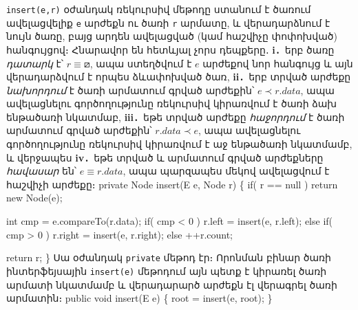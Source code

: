 \texttt{insert(e,r)} օժանդակ ռեկուրսիվ մեթոդը ստանում է 
ծառում ավելացվելիք \texttt{e} արժեքն ու ծառի \texttt{r} 
արմատը, և վերադարձնում է նույն ծառը, բայց արդեն ավելացված 
(կամ հաշվիչը փոփոխված) հանգույցով։ 
Հնարավոր են հետևյալ չորս դեպքերը․ 
\textbf{i․}~երբ ծառը \emph{դատարկ} է՝ \(r\equiv\boxslash\), ապա 
ստեղծվում է \(e\) արժեքով նոր հանգույց և այն վերադարձվում 
է որպես ձևափոխված ծառ,  
\textbf{ii․}~երբ տրված արժեքը \emph{նախորդում} է ծառի արմատում 
գրված արժեքին՝ \(e\prec r.data\), ապա ավելացնելու գործողությունը 
ռեկուրսիվ կիրառվում է ծառի ձախ ենթածառի նկատմաբ, 
\textbf{iii․}~եթե տրված արժեքը \emph{հաջորդում} է ծառի 
արմատում գրված արժեքին՝ \(r.data\prec e\), ապա ավելացնելու 
գործողությունը ռեկուրսիվ կիրառվում է աջ ենթածառի նկատմամբ, 
և վերջապես \textbf{iv․}~եթե տրված և արմատում գրված արժեքները 
\emph{հավասար} են՝ \(e\equiv r.data\), ապա պարզապես մեկով 
ավելացվում է հաշվիչի արժեքը։ 
\nwenddocs{}\endmoddef{}
private Node insert(E e, Node r)
\{
  if( r == null )
    return new Node(e);

  int cmp = e.compareTo(r.data);
  if( cmp < 0 )
    r.left = insert(e, r.left);
  else if( cmp > 0 )
    r.right = insert(e, r.right);
  else
    ++r.count;

  return r;
\}
\nwendcode{}\nwdocspar
Սա օժանդակ \texttt{private} մեթոդ էր։ Որոնման բինար ծառի
ինտերֆեյսային \texttt{insert(e)} մեթոդում այն պետք է կիրառել
ծառի արմատի նկատմամբ և վերադարարծ արժեքն էլ վերագրել ծառի 
արմատին։
\nwenddocs{}\plusendmoddef
public void insert(E e)
\{
  root = insert(e, root);
\}
\nwendcode{}\nwdocspar

%
%
